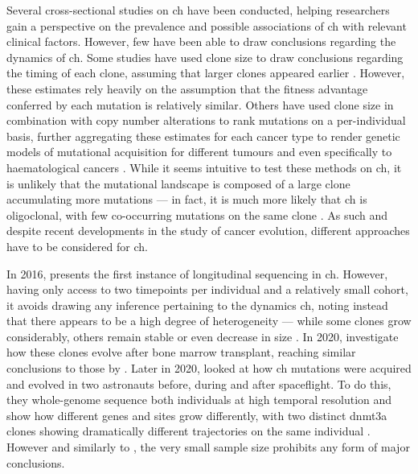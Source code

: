 Several cross-sectional studies on \ac{ch} have been conducted, helping researchers gain a perspective on the prevalence and possible associations of \ac{ch} with relevant clinical factors. However, few have been able to draw conclusions regarding the dynamics of \ac{ch}. Some studies have used clone size to draw conclusions regarding the timing of each clone, assuming that larger clones appeared earlier \cite{Li2018-vz}. However, these estimates rely heavily on the assumption that the fitness advantage conferred by each mutation is relatively similar. Others have used clone size in combination with copy number alterations to rank mutations on a per-individual basis, further aggregating these estimates for each cancer type to render genetic models of mutational acquisition for different tumours \cite{Jolly2018-yb,Gerstung2020-kf} and even specifically to haematological cancers \cite{Papaemmanuil2013-yt}. While it seems intuitive to test these methods on \ac{ch}, it is unlikely that the mutational landscape is composed of a large clone accumulating more mutations --- in fact, it is much more likely that \ac{ch} is oligoclonal, with few co-occurring mutations on the same clone \cite{Miles2020-fz,Mitchell2021-zl,Saiki2021-sq}. As such and despite recent developments in the study of cancer evolution, different approaches have to be considered for \ac{ch}.

In 2016,  presents the first instance of longitudinal sequencing in \ac{ch}. However, having only access to two timepoints per individual and a relatively small cohort, it avoids drawing any inference pertaining to the dynamics \ac{ch}, noting instead that there appears to be a high degree of heterogeneity --- while some clones grow considerably, others remain stable or even decrease in size \cite{Young2016-du}. In 2020,  investigate how these clones evolve after bone marrow transplant, reaching similar conclusions to those by  \cite{Suarez-Gonzalez2020-hn}. Later in 2020,  looked at how \ac{ch} mutations were acquired and evolved in two astronauts before, during and after spaceflight. To do this, they whole-genome sequence both individuals at high temporal resolution and show how different genes and sites grow differently, with two distinct \ac{dnmt3a} clones showing dramatically different trajectories on the same individual \cite{Mencia-Trinchant2020-eb}. However and similarly to \cite{Young2016-du}, the very small sample size prohibits any form of major conclusions.

